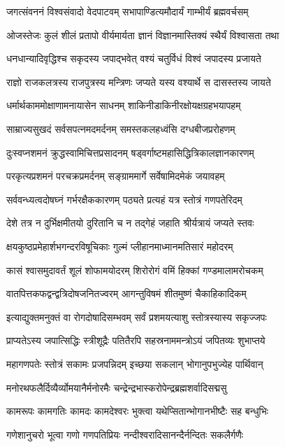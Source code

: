 \twolineshloka
{जगत्संवननं विश्वसंवादो वेदपाटवम्}
{सभापाण्डित्यमौदार्यं गाम्भीर्यं ब्रह्मवर्चसम्}

\twolineshloka
{ओजस्तेजः कुलं शीलं प्रतापो वीर्यमार्यता}
{ज्ञानं विज्ञानमास्तिक्यं स्थैर्यं विश्वासता तथा}

\twolineshloka
{धनधान्यादिवृद्धिश्च सकृदस्य जपाद्भवेत्}
{वश्यं चतुर्विधं विश्वं जपादस्य प्रजायते}

\twolineshloka
{राज्ञो राजकलत्रस्य राजपुत्रस्य मन्त्रिणः}
{जप्यते यस्य वश्यार्थे स दासस्तस्य जायते}

\twolineshloka
{धर्मार्थकाममोक्षाणामनायासेन साधनम्}
{शाकिनीडाकिनीरक्षोयक्षग्रहभयापहम्}

\twolineshloka
{साम्राज्यसुखदं सर्वसपत्नमदमर्दनम्}
{समस्तकलहध्वंसि दग्धबीजप्ररोहणम्}

\twolineshloka
{दुःस्वप्नशमनं क्रुद्धस्वामिचित्तप्रसादनम्}
{षड्वर्गाष्टमहासिद्धित्रिकालज्ञानकारणम्}

\twolineshloka
{परकृत्यप्रशमनं परचक्रप्रमर्दनम्}
{सङ्ग्राममार्गे सर्वेषामिदमेकं जयावहम्}

\twolineshloka
{सर्ववन्ध्यत्वदोषघ्नं गर्भरक्षैककारणम्}
{पठ्यते प्रत्यहं यत्र स्तोत्रं गणपतेरिदम्}

\twolineshloka
{देशे तत्र न दुर्भिक्षमीतयो दुरितानि च}
{न तद्गेहं जहाति श्रीर्यत्रायं जप्यते स्तवः}

\twolineshloka
{क्षयकुष्ठप्रमेहार्शभगन्दरविषूचिकाः}
{गुल्मं प्लीहानमाध्मानमतिसारं महोदरम्}

\twolineshloka
{कासं श्वासमुदावर्तं शूलं शोफामयोदरम्}
{शिरोरोगं वमिं हिक्कां गण्डमालामरोचकम्}

\twolineshloka
{वातपित्तकफद्वन्द्वत्रिदोषजनितज्वरम्}
{आगन्तुविषमं शीतमुष्णं चैकाहिकादिकम्}

\twolineshloka
{इत्याद्युक्तमनुक्तं वा रोगदोषादिसम्भवम्}
{सर्वं प्रशमयत्याशु स्तोत्रस्यास्य सकृज्जपः}

\twolineshloka
{प्राप्यतेऽस्य जपात्सिद्धिः स्त्रीशूद्रैः पतितैरपि}
{सहस्रनाममन्त्रोऽयं जपितव्यः शुभाप्तये}

\twolineshloka
{महागणपतेः स्तोत्रं सकामः प्रजपन्निदम्}
{इच्छया सकलान् भोगानुपभुज्येह पार्थिवान्}

\twolineshloka
{मनोरथफलैर्दिव्यैर्व्योमयानैर्मनोरमैः}
{चन्द्रेन्द्रभास्करोपेन्द्रब्रह्मशर्वादिसद्मसु}

\twolineshloka
{कामरूपः कामगतिः कामदः कामदेश्वरः}
{भुक्त्वा यथेप्सितान्भोगानभीष्टैः सह बन्धुभिः}

\twolineshloka
{गणेशानुचरो भूत्वा गणो गणपतिप्रियः}
{नन्दीश्वरादिसानन्दैर्नन्दितः सकलैर्गणैः}

